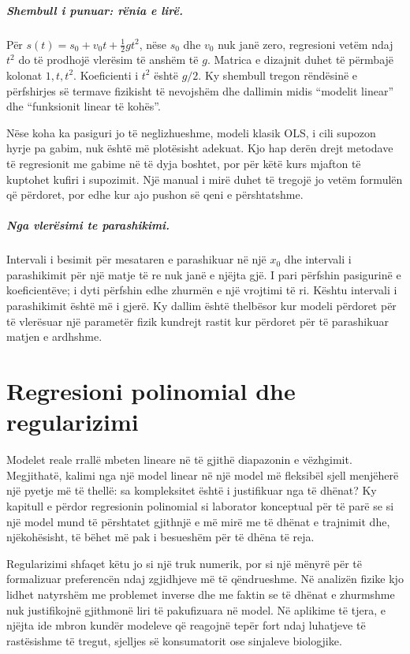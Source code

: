 \documentclass[12pt,a4paper,oneside]{book}
\begin{document}
\paragraph{Shembull i punuar: rënia e lirë.}
Për $s(t)=s_0+v_0t+\tfrac12gt^2$, nëse $s_0$ dhe $v_0$ nuk janë zero, regresioni vetëm ndaj $t^2$ do të prodhojë vlerësim të anshëm të $g$. Matrica e dizajnit duhet të përmbajë kolonat $1,t,t^2$. Koeficienti i $t^2$ është $g/2$. Ky shembull tregon rëndësinë e përfshirjes së termave fizikisht të nevojshëm dhe dallimin midis ``modelit linear'' dhe ``funksionit linear të kohës''.

Nëse koha ka pasiguri jo të neglizhueshme, modeli klasik OLS, i cili supozon hyrje pa gabim, nuk është më plotësisht adekuat. Kjo hap derën drejt metodave të regresionit me gabime në të dyja boshtet, por për këtë kurs mjafton të kuptohet kufiri i supozimit. Një manual i mirë duhet të tregojë jo vetëm formulën që përdoret, por edhe kur ajo pushon së qeni e përshtatshme.

\paragraph{Nga vlerësimi te parashikimi.}
Intervali i besimit për mesataren e parashikuar në një $x_0$ dhe intervali i parashikimit për një matje të re nuk janë e njëjta gjë. I pari përfshin pasigurinë e koeficientëve; i dyti përfshin edhe zhurmën e një vrojtimi të ri. Kështu intervali i parashikimit është më i gjerë. Ky dallim është thelbësor kur modeli përdoret për të vlerësuar një parametër fizik kundrejt rastit kur përdoret për të parashikuar matjen e ardhshme.

\chapter[Regresioni polinomial]{Regresioni polinomial dhe regularizimi}

Modelet reale rrallë mbeten lineare në të gjithë diapazonin e vëzhgimit. Megjithatë, kalimi nga një model linear në një model më fleksibël sjell menjëherë një pyetje më të thellë: sa kompleksitet është i justifikuar nga të dhënat? Ky kapitull e përdor regresionin polinomial si laborator konceptual për të parë se si një model mund të përshtatet gjithnjë e më mirë me të dhënat e trajnimit dhe, njëkohësisht, të bëhet më pak i besueshëm për të dhëna të reja.

Regularizimi shfaqet këtu jo si një truk numerik, por si një mënyrë për të formalizuar preferencën ndaj zgjidhjeve më të qëndrueshme. Në analizën fizike kjo lidhet natyrshëm me problemet inverse dhe me faktin se të dhënat e zhurmshme nuk justifikojnë gjithmonë liri të pakufizuara në model. Në aplikime të tjera, e njëjta ide mbron kundër modeleve që reagojnë tepër fort ndaj luhatjeve të rastësishme të tregut, sjelljes së konsumatorit ose sinjaleve biologjike.
\end{document}
